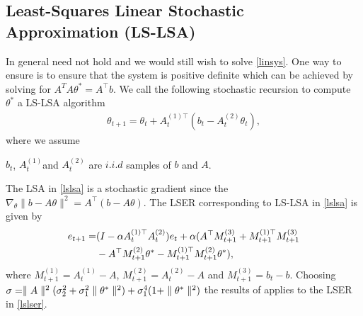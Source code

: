 \subsection{Least-Squares Linear Stochastic Approximation (LS-LSA)}
In general  need not hold and we would still wish to solve \eqref{linsys}. One way to ensure  is to ensure that the system is positive definite which can be achieved by solving for $A^TA\theta^*=A^\top b$. We call the following stochastic recursion to compute $\theta^*$ a LS-LSA algorithm
\begin{align}\label{lslsa}
\theta_{t+1}=\theta_t+A^{(1)\top}_t(b_t-A^{(2)}_t\theta_t),
\end{align}
where we assume
\begin{assumption}\label{lsassump}
$b_t$, $A^{(1)}_t$and $A^{(2)}_t$ are $i.i.d$ samples of $b$ and $A$.
\end{assumption}
The LSA in \eqref{lslsa} is a stochastic gradient since the $\nabla_\theta \parallel b-A\theta\parallel^2=A^\top(b-A\theta)$. The LSER corresponding to LS-LSA in \eqref{lslsa} is given by
\begin{align}
e_{t+1}=&(I-\alpha A^{(1)\top}_tA^{(2)}_t)e_t+\alpha(A^\top M^{(3)}_{t+1}+M^{(1)\top}_{t+1}M^{(3)}_{t+1}\nonumber\\&-A^\top M^{(2)}_{t+1}\theta^*-M^{(1)\top}_{t+1}M^{(2)}_{t+1}\theta^*),
\end{align}
where $M^{(1)}_{t+1}=A^{(1)}_t-A$, $M^{(2)}_{t+1}=A^{(2)}_t-A$ and $M^{(3)}_{t+1}=b_t-b$. Choosing $\sigma=\parallel A\parallel^2 (\sigma_2^2+\sigma_1^2\parallel \theta^*\parallel^2)+ \sigma_1^4(1+\parallel \theta^*\parallel^2)$ the results of  applies to the LSER in \eqref{lslser}.

